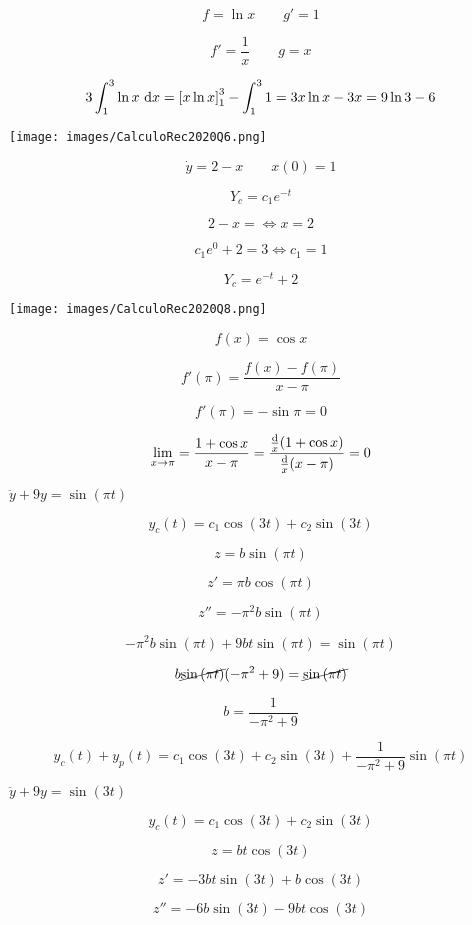 \documentclass{scrartcl}
\DeclareRobustCommand*\d
{\ifmmode\mathop{}\!\mathrm{d}\else\expandafter\originald\fi}
\begin{document}
	\[f = \ln{x} \qquad g' = 1 \]
	
	\[f' = \frac{1}{x} \qquad g = x\]
	
	\[3 \int_{1}^{3} \ln{x} \, \d x = \left[x\ln{x}\right]_{1}^{3} - \int_{1}^{3} 1 = 3x\ln{x} - 3x = 9\ln{3}-6 \]
	
	
	
	\texttt{[image: images/CalculoRec2020Q6.png]}
	
	\[\dot y = 2 -x \qquad x(0)=1\]
	
	\[Y_c=c_1e^{-t}\]
	
	\[2-x = \Leftrightarrow x = 2\]
	
	\[c_1e^{0}+2 = 3 \Leftrightarrow c_1 = 1\]
	
	\[Y_c = e^{-t}+2\]
	
	
	\texttt{[image: images/CalculoRec2020Q8.png]}
	
	
	\[f(x) = \cos{x}\]
	
	\[f'(\pi)=\frac{f(x)-f(\pi)}{x-\pi}\]
	
	\[f'(\pi) = -\sin{\pi} = 0 \]
	
	
	
	\[\lim\limits_{x \to \pi} =\frac{1+\cos{x}}{x-\pi} = \frac{\frac{\d }{x} (1+\cos{x})}{\frac{\d }{x}(x-\pi)} = 0\]
	
	\textbf{$\ddot y + 9 y = \sin{(\pi t)}$}
	
	\[y_c(t)=c_1 \cos{(3t)} + c_2 \sin{(3t)}\]
	
	\[z=b \sin{(\pi t)}\]
	
	\[z'=\pi b \cos{(\pi t)}\]
	
	\[z''=-\pi^2 b \sin{(\pi t)}\]
	
	\[-\pi^2 b \sin{(\pi t)} + 9b t\sin{(\pi t)}=\sin{( \pi t)}\]
	
	\[b \cancel{\sin{(\pi t)}}(-\pi^2  + 9) =\cancel{\sin{(\pi t)}}\]
	
	\[b = \frac{1}{-\pi^2  + 9}\]
	
	\[y_c(t) + y_p(t) =c_1 \cos{(3t)} + c_2 \sin{(3t)} + \frac{1}{-\pi^2  + 9} \sin{(\pi t)}\]
	
	\textbf{$\ddot y + 9 y = \sin{(3t)}$}
	
	
	\[y_c(t)=c_1 \cos{(3t)} + c_2 \sin{(3t)}\]
	
	\[z=b t\cos{(3t)}\]
	
	\[z'=-3bt\sin{(3t)}+b\cos{(3t)}\]
	
	\[z''=-6b\sin{(3t)}-9bt\cos{(3t)}\]
	
\end{document}
